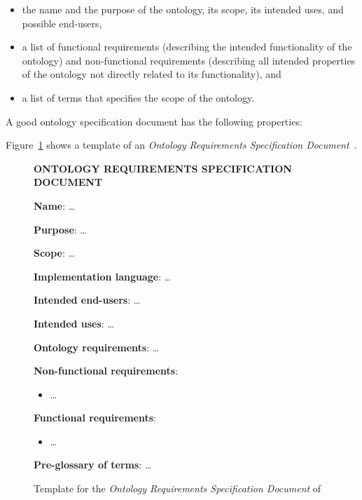 \begin{itemize}
  \item the name and the purpose of the ontology, its scope, its intended uses, and possible end-users,
  \item a list of functional requirements (describing the intended functionality of the ontology) and non-functional requirements (describing all intended properties of the ontology not directly related to its functionality), and
  \item a list of terms that specifies the scope of the ontology.
\end{itemize}

A good ontology specification document has the following properties:

Figure~\ref{fig:ontology_specification_template} shows a template of an \emph{Ontology Requirements Specification Document}~\cite{ORSD}.

\begin{figure}
\begin{mdframed}[linewidth=.6pt]
\setlength{\parindent}{0pt}
\MakeUppercase{\textbf{Ontology Requirements Specification Document}}

\textbf{Name}: …

\textbf{Purpose}: …

\textbf{Scope}: …

\textbf{Implementation language}: …

\textbf{Intended end-users}: …

\textbf{Intended uses}: …

\textbf{Ontology requirements}: …

\setlength{\leftskip}{.5cm}

\textbf{Non-functional requirements}: 

\begin{itemize}
  \item …
\end{itemize}

\textbf{Functional requirements}: 

\begin{itemize}
  \item …
\end{itemize}

\setlength{\leftskip}{0cm}

\textbf{Pre-glossary of terms}: …

\end{mdframed}

\caption{Template for the \emph{Ontology Requirements Specification Document} of \methontology~\cite{ORSD}}
\label{fig:ontology_specification_template}
\end{figure}

